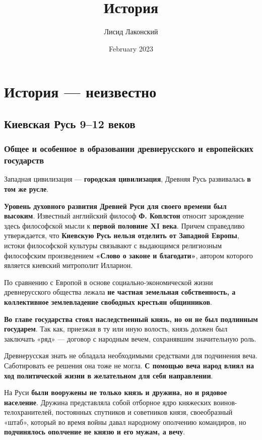\documentclass{article}
\title{История}
\author{Лисид Лаконский}
\date{February 2023}
\begin{document}
\raggedright

\maketitle
\tableofcontents
\pagebreak

\section{История — неизвестно}

\subsection{Киевская Русь 9–12 веков}

\subsubsection{Общее и особенное в образовании древнерусского и европейских государств}

Западная цивилизация — \textbf{городская цивилизация}, Древняя Русь развивалась \textbf{в том же русле}.

\textbf{Уровень духовного развития Древней Руси для своего времени был высоким}. Известный английский философ \textbf{Ф. Коплстон} относит зарождение здесь философской мысли к \textbf{первой половине XI века}. Причем справедливо утверждается, что \textbf{Киевскую Русь нельзя отделить от Западной Европы}, истоки философской культуры связывают с выдающимся религиозным философским произведением \textbf{«Слово о законе и благодати»}, автором которого является киевский митрополит Илларион.

\hfill

По сравнению с Европой в основе социально-экономической жизни древнерусского общества лежала \textbf{не частная земельная собственность, а коллективное землевладение свободных крестьян общинников}.

\textbf{Во главе государства стоял наследственный князь, но он не был подлинным государем}. Так как, приезжая в ту или иную волость, князь должен был заключать «ряд» — договор с народным вечем, сохранявшим значительную роль.

Древнерусская знать не обладала необходимыми средствами для подчинения веча. Саботировать ее решения она тоже не могла. \textbf{С помощью веча народ влиял на ход политической жизни в желательном для себя направлении}.

 \hfill

 На Руси \textbf{были вооружены не только князь и дружина, но и рядовое население}. Дружина представляла собой отборное ядро княжеских воинов-телохранителей, постоянных спутников и советников князя, своеобразный «штаб», который во время войны давал народному ополчению командиров, но \textbf{подчинялось ополчение не князю и его мужам, а вечу}.
\end{document}
